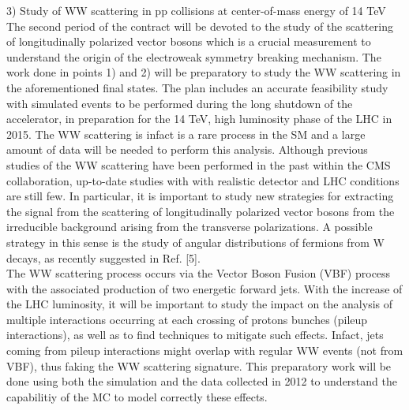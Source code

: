 \documentclass[10pt, a4paper]{article}
\begin{document}
3) Study of WW scattering in pp collisions at center-of-mass energy of 14 TeV \\
The second period of the contract will be devoted to the study 
of the scattering of longitudinally polarized vector bosons which is 
a crucial measurement to understand the origin of the electroweak symmetry breaking mechanism. 
The work done in points 1) and 2) will be preparatory to study the WW scattering 
in the aforementioned final states.
The plan includes an accurate feasibility study with simulated events to be performed 
during the long shutdown of the accelerator, in preparation for the 14 TeV, high 
luminosity phase of the LHC in 2015. The WW scattering is infact is a rare process 
in the SM and a large amount of data will be needed to perform this analysis. 
Although previous studies of the WW scattering have been performed in the 
past within the CMS collaboration, up-to-date studies with with realistic detector and 
LHC conditions are still few. In particular, it is important to study new strategies for extracting the signal from the scattering of longitudinally polarized vector bosons from the irreducible background arising from the transverse polarizations. A possible strategy in this sense is the study of angular distributions of fermions from W decays, as recently suggested in Ref. [5]. \\
The WW scattering process occurs via the Vector Boson Fusion (VBF) process
with the associated production of two energetic forward jets. With the increase of the 
LHC luminosity, it will be important to study the impact on the analysis of multiple 
interactions occurring at each crossing of protons 
bunches (pileup interactions), as well as to find techniques to mitigate such effects.
Infact, jets coming from pileup interactions might overlap with regular 
WW events (not from VBF), thus faking the WW scattering signature. This preparatory
work will be done using both the simulation and the data collected in 2012 to understand the 
capabilitiy of the MC to model correctly these effects. \\
\end{document}
